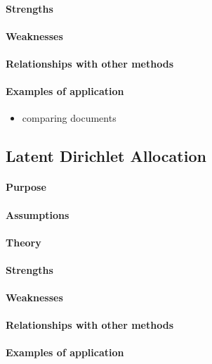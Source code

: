 \paragraph{Strengths}
\paragraph{Weaknesses}
\paragraph{Relationships with other methods}
\paragraph{Examples of application}
\begin{itemize}
    \item comparing documents
\end{itemize}


\subsection{Latent Dirichlet Allocation}
\paragraph{Purpose}
\paragraph{Assumptions}
\paragraph{Theory}
\paragraph{Strengths}
\paragraph{Weaknesses}
\paragraph{Relationships with other methods}
\paragraph{Examples of application}


